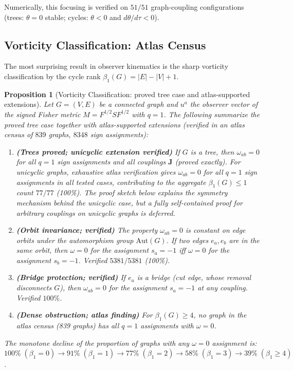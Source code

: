 \documentclass[11pt]{article}
\newtheorem{proposition}[theorem]{Proposition}
\theoremstyle{definition}
\theoremstyle{remark}
\newcommand{\Fish}{F}
\newcommand{\sgn}{S}
\newcommand{\Met}{M}
\newcommand{\obs}{u}
\newcommand{\vort}{\omega}
\newcommand{\coupl}{\mathbf{J}}
\newcommand{\betti}{\beta_1}
\newcommand{\expan}{\theta}
\begin{document}
Numerically, this focusing is verified on $51/51$ graph-coupling
configurations (trees: $\expan = 0$ stable; cycles: $\expan < 0$ and
$d\expan/d\tau < 0$).

\subsection{Vorticity Classification: Atlas Census}
\label{subsec:vorticity-census}

The most surprising result in observer kinematics is the sharp
vorticity classification by the cycle rank $\betti(G) = |E| - |V| + 1$.

\begin{proposition}[Vorticity Classification: proved tree case and atlas-supported extensions]
\label{thm:vorticity}
Let $G = (V, E)$ be a connected graph and $\obs^a$ the observer vector
of the signed Fisher metric $\Met = \Fish^{1/2}\sgn\Fish^{1/2}$ with
$q = 1$. The following summarize the proved tree case together with
atlas-supported extensions (verified in an atlas census of $839$ graphs,
$8348$ sign assignments):
\begin{enumerate}
\item[(i)] \textbf{(Trees proved; unicyclic extension verified)} If $G$
  is a tree, then $\vort_{ab} = 0$ for all $q = 1$ sign assignments and
  all couplings $\coupl$ (proved exactly). For unicyclic graphs,
  exhaustive atlas verification gives $\vort_{ab} = 0$ for all $q = 1$
  sign assignments in all tested cases, contributing to the aggregate
  $\betti(G) \leq 1$ count $77/77$ (100\%). The proof sketch below explains
  the symmetry mechanism behind the unicyclic case, but a fully
  self-contained proof for arbitrary couplings on unicyclic graphs is
  deferred.
\item[(ii)] \textbf{(Orbit invariance; verified)} The property
  $\vort_{ab} = 0$ is constant on edge orbits under the automorphism
  group $\mathrm{Aut}(G)$. If two edges $e_a, e_b$ are in the same
  orbit, then $\vort = 0$ for the assignment $s_a = -1$ iff
  $\vort = 0$ for the assignment $s_b = -1$. Verified $5381/5381$ (100\%).
\item[(iii)] \textbf{(Bridge protection; verified)} If $e_a$ is a bridge
  (cut edge, whose removal disconnects $G$), then $\vort_{ab} = 0$
  for the assignment $s_a = -1$ at any coupling. Verified $100\%$.
\item[(iv)] \textbf{(Dense obstruction; atlas finding)} For $\betti(G) \geq 4$,
  no graph in the atlas census (839 graphs) has all $q = 1$ assignments
  with $\vort = 0$.
\end{enumerate}
The monotone decline of the proportion of graphs with any $\vort = 0$
assignment is:
$100\%\;(\betti = 0) \to 91\%\;(\betti = 1) \to 77\%\;(\betti = 2)
\to 58\%\;(\betti = 3) \to 39\%\;(\betti \geq 4)$.
\end{proposition}
\end{document}
